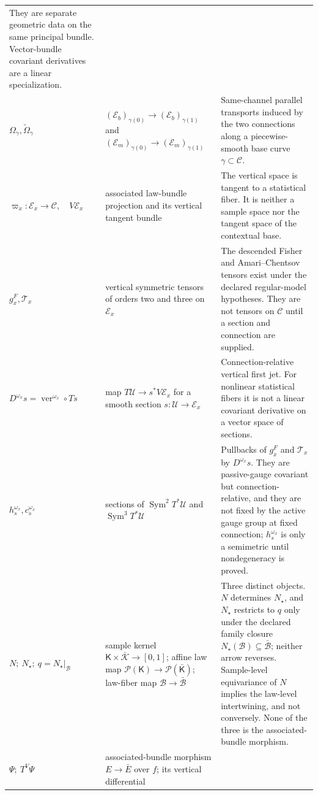 \begin{longtable}{@{}>{\raggedright\arraybackslash}p{}
>{\raggedright\arraybackslash}p{}
>{\raggedright\arraybackslash}p{}@{}}
They are separate geometric data on the same principal bundle. Vector-bundle covariant
derivatives are a linear specialization. \\
\(\Omega_\gamma,\widetilde\Omega_\gamma\) &
\((\mathcal E_b)_{\gamma(0)}\to(\mathcal E_b)_{\gamma(1)}\) and
\((\mathcal E_m)_{\gamma(0)}\to(\mathcal E_m)_{\gamma(1)}\) &
Same-channel parallel transports induced by the two connections along a
piecewise-smooth base curve \(\gamma\subset\mathcal C\). \\
\(\varpi_x:\mathcal E_x\to\mathcal C,\quad V\mathcal E_x\) &
associated law-bundle projection and its vertical tangent bundle &
The vertical space is tangent to a statistical fiber.  It is neither a sample
space nor the tangent space of the contextual base. \\
\(g_x^F,\mathcal T_x\) &
vertical symmetric tensors of orders two and three on \(\mathcal E_x\) &
The descended Fisher and Amari--Chentsov tensors exist under the declared
regular-model hypotheses. They are not tensors on \(\mathcal C\) until a
section and connection are supplied. \\
\(D^{\omega_x}s=\operatorname{ver}^{\omega_x}\circ Ts\) &
map \(T\mathcal U\to s^*V\mathcal E_x\) for a smooth section
\(s:\mathcal U\to\mathcal E_x\) &
Connection-relative vertical first jet.  For nonlinear statistical fibers it
is not a linear covariant derivative on a vector space of sections. \\
\(h_s^{\omega_x},c_s^{\omega_x}\) &
sections of \(\operatorname{Sym}^2T^*\mathcal U\) and
\(\operatorname{Sym}^3T^*\mathcal U\) &
Pullbacks of \(g_x^F\) and \(\mathcal T_x\) by \(D^{\omega_x}s\).  They are
passive-gauge covariant but connection-relative, and they are not fixed by the
active gauge group at fixed connection; \(h_s^{\omega_x}\) is only a
semimetric until nondegeneracy is proved. \\
\(N;\ N_\star;\ q=N_\star|_{\mathcal B}\) &
sample kernel \(\mathsf K\times\bar{\mathscr K}\to[0,1]\); affine law map
\(\mathcal P(\mathsf K)\to\mathcal P(\bar{\mathsf K})\); law-fiber map
\(\mathcal B\to\bar{\mathcal B}\) &
Three distinct objects.  \(N\) determines \(N_\star\), and \(N_\star\)
restricts to \(q\) only under the declared family closure
\(N_\star(\mathcal B)\subseteq\bar{\mathcal B}\); neither arrow reverses.
Sample-level equivariance of \(N\) implies the law-level intertwining, and not
conversely.  None of the three is the associated-bundle morphism. \\
\(\Psi;\ T^V\Psi\) &
associated-bundle morphism \(E\to\bar E\) over \(f\); its vertical differential

\end{longtable}
